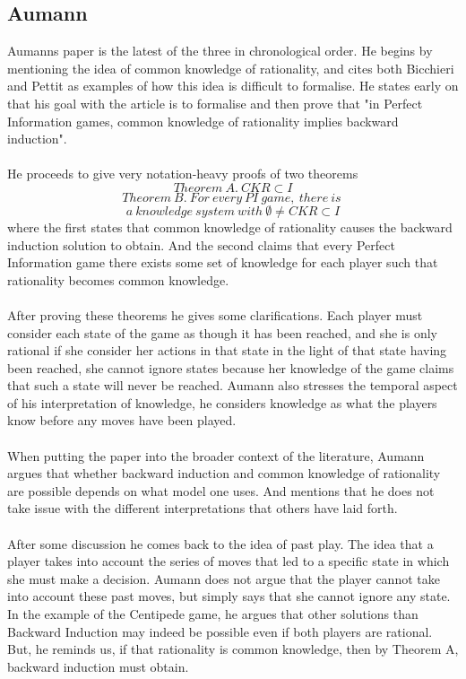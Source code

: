 \documentclass{article}
\begin{document}
\subsection{Aumann}
Aumanns paper is the latest of the three in chronological order. He begins by mentioning the idea of common knowledge of rationality, and cites both Bicchieri and Pettit as examples of how this idea is difficult to formalise. He states early on that his goal with the article is to formalise and then prove that "in Perfect Information games, common knowledge of rationality implies backward induction".
\\
\\
He proceeds to give very notation-heavy proofs of two theorems
$$ Theorem\ A. \ CKR \subset I $$
$$ Theorem\ B. \ For \ every \ PI\ game,\ there\ is\ $$
$$a\ knowledge\ system\ with\ \emptyset \neq CKR \subset I $$
where the first states that common knowledge of rationality causes the backward induction solution to obtain. And the second claims that every Perfect Information game there exists some set of knowledge for each player such that rationality becomes common knowledge.
\\
\\
After proving these theorems he gives some clarifications. Each player must consider each state of the game as though it has been reached, and she is only rational if she consider her actions in that state in the light of that state having been reached, she cannot ignore states because her knowledge of the game claims that such a state will never be reached. Aumann also stresses the temporal aspect of his interpretation of knowledge, he considers knowledge as what the players know before any moves have been played.
\\
\\
When putting the paper into the broader context of the literature, Aumann argues that whether backward induction and common knowledge of rationality are possible depends on what model one uses. And mentions that he does not take issue with the different interpretations that others have laid forth.
\\
\\
After some discussion he comes back to the idea of past play. The idea that a player takes into account the series of moves that led to a specific state in which she must make a decision. Aumann does not argue that the player cannot take into account these past moves, but simply says that she cannot ignore any state. In the example of the Centipede game, he argues that other solutions than Backward Induction may indeed be possible even if both players are rational. But, he reminds us, if that rationality is common knowledge, then by Theorem A, backward induction must obtain.
\end{document}
